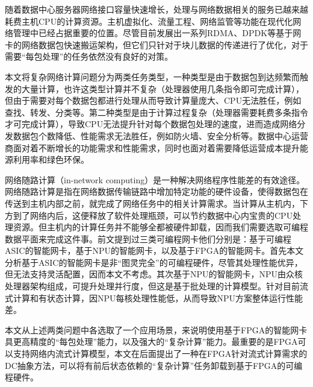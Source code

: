 




%
%

随着数据中心服务器网络接口容量快速增长，处理与网络数据相关的服务已越来越耗费主机CPU的计算资源。主机虚拟化、流量工程、网络监管等功能在现代化网络管理中已经占据重要的位置。尽管目前发展出一系列RDMA、DPDK等基于网卡的网络数据包快速搬运架构，但它们只针对于块儿数据的传递进行了优化，对于需要“每包处理”的任务依然没有良好的对策。



本文将复杂网络计算问题分为两类任务类型，一种类型是由于数据包到达频繁而触发的大量计算，也许这类型计算并不复杂（处理器使用几条指令即可完成计算），但由于需要对每个数据包都进行处理从而导致计算量庞大、CPU无法胜任，例如查找、转发、分类等。第二种类型是由于计算过程复杂（处理器需要耗费多条指令才可完成计算），导致CPU无法提升针对每个数据包处理的速度，进而造成网络分发数据包个数降低、性能需求无法胜任，例如防火墙、安全分析等。数据中心运营商面对着不断增长的功能需求和性能需求，同时也面对着需要降低运营成本提升能源利用率和绿色环保。

网络随路计算（in-network computing）是一种解决网络程序性能差的有效途径。网络随路计算是指在网络数据传输链路中增加特定功能的硬件设备，使得数据包在传送到主机内部之前，就完成了网络任务中的相关计算需求。当计算从主机内，下方到了网络内后，这便释放了软件处理瓶颈，可以节约数据中心内宝贵的CPU处理资源。但主机内的计算任务并不能够全都被硬件卸载，因而我们需要选取可编程数据平面来完成这件事。前文提到过三类可编程网卡他们分别是：基于可编程ASIC的智能网卡，基于NPU的智能网卡，以及基于FPGA的智能网卡。首先本文分析基于ASIC的智能网卡是非“图灵完全”的可编程硬件，尽管其处理性能优异，但无法支持灵活配置，因而本文不考虑。其次基于NPU的智能网卡，NPU由众核处理器架构组成，可提升处理并行度，但这是基于批处理的计算模型。针对目前流式计算和有状态计算，因NPU每核处理性能低，从而导致NPU方案整体运行性能差。

本文从上述两类问题中各选取了一个应用场景，来说明使用基于FPGA的智能网卡具更高精度的“每包处理”能力，以及强大的“复杂计算”能力。最重要的是FPGA可以支持网络内流式计算模型，本文在后面提出了一种在FPGA针对流式计算需求的DC抽象方法，可以将有前后状态依赖的“复杂计算”任务卸载到基于FPGA的可编程硬件。





